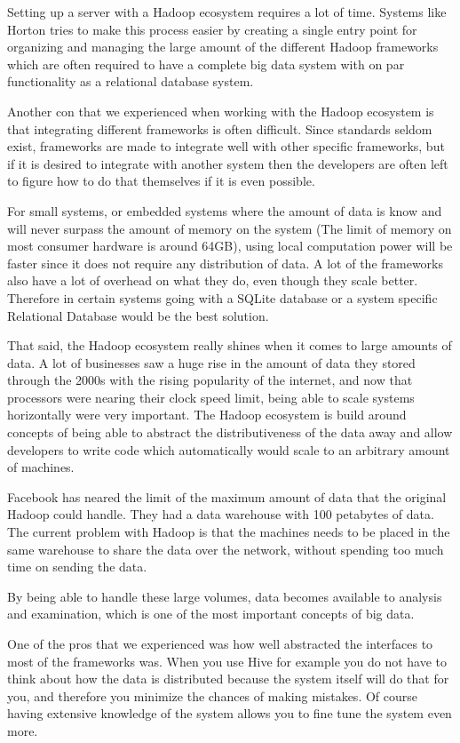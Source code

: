 Setting up a server with a Hadoop ecosystem requires a lot of time. Systems like Horton tries to make this process easier by creating a single entry point for organizing and managing the large amount of the different Hadoop frameworks which are often required to have a complete big data system with on par functionality as a relational database system. 

\newpar Another con that we experienced when working with the Hadoop ecosystem is that integrating different frameworks is often difficult. Since standards seldom exist, frameworks are made to integrate well with other specific frameworks, but if it is desired to integrate with another system then the developers are often left to figure how to do that themselves if it is even possible.

\newpar For small systems, or embedded systems where the amount of data is know and will never surpass the amount of memory on the system (The limit of memory on most consumer hardware is around 64GB), using local computation power will be faster since it does not require any distribution of data. A lot of the frameworks also have a lot of overhead on what they do, even though they scale better. Therefore in certain systems going with a SQLite database or a system specific Relational Database would be the best solution.

\newpar That said, the Hadoop ecosystem really shines when it comes to large amounts of data. A lot of businesses saw a huge rise in the amount of data they stored through the 2000s with the rising popularity of the internet, and now that processors were nearing their clock speed limit, being able to scale systems horizontally were very important. The Hadoop ecosystem is build around concepts of being able to abstract the distributiveness of the data away and allow developers to write code which automatically would scale to an arbitrary amount of machines. 

Facebook has neared the limit of the maximum amount of data that the original Hadoop could handle. They had a data warehouse with 100 petabytes of data. The current problem with Hadoop is that the machines needs to be placed in the same warehouse to share the data over the network, without spending too much time on sending the data\cite{limit-hadoop}.

By being able to handle these large volumes, data becomes available to analysis and examination, which is one of the most important concepts of big data.

\newpar One of the pros that we experienced was how well abstracted the interfaces to most of the frameworks was. When you use Hive for example you do not have to think about how the data is distributed because the system itself will do that for you, and therefore you minimize the chances of making mistakes. Of course having extensive knowledge of the system allows you to fine tune the system even more.

